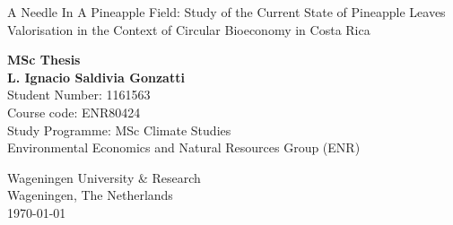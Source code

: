\begin{titlepage}

\vspace*{2cm}
\centering
\begin{Large}\bfseries

A Needle In A Pineapple Field: Study of the Current State of Pineapple Leaves Valorisation in the Context of Circular Bioeconomy in Costa Rica

\end{Large}

\vspace{2cm}

\begin{center}%

\textbf{MSc Thesis} \\ \vspace{2cm}
\textbf{L. Ignacio Saldivia Gonzatti} \\ \vspace{0.25cm}
 Student Number: 1161563 \\ \vspace{0.25cm}
Course code: ENR80424\\  \vspace{0.25cm}
Study Programme: MSc Climate Studies \\ \vspace{0.25cm}
Environmental Economics and Natural Resources Group (ENR)  \vspace{0.25cm}


       \vfill
            
            
        Wageningen University \& Research\\
        Wageningen, The Netherlands\\
       \today

\end{center}
\end{titlepage}